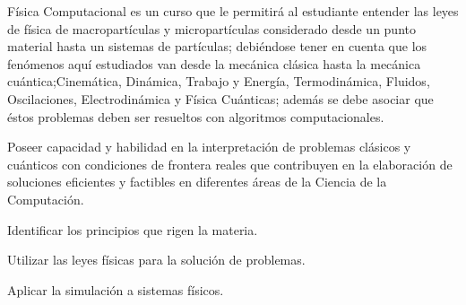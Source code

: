 \begin{syllabus}


\begin{justification}
Física Computacional es un curso que le permitirá al estudiante entender
las leyes de física de macropartículas y micropartículas considerado desde un
punto material hasta un sistemas de partículas; debiéndose tener en cuenta que los
fenómenos aquí estudiados van desde la mecánica clásica hasta la mecánica cuántica;Cinemática, Dinámica, Trabajo y Energía, Termodinámica, Fluidos, Oscilaciones, Electrodinámica y Física Cuánticas; 
además se debe asociar que éstos problemas deben ser resueltos con algoritmos computacionales.

Poseer capacidad y habilidad en la interpretación de problemas clásicos y cuánticos 
con condiciones de frontera reales que contribuyen en la elaboración de soluciones eficientes
y factibles en diferentes áreas de la Ciencia de la Computación.
\end{justification}

\begin{goals}
\item Identificar los principios que rigen la materia.
\item Utilizar las leyes físicas para la solución de problemas.
\item Aplicar la simulación a sistemas físicos.
\end{goals}

\begin{outcomes}
  \item {}
  \item {}
  \item {}
\end{outcomes}

\begin{competences}
  \item {} 
  \item {}
  \item {}
\end{competences}


\end{syllabus}
